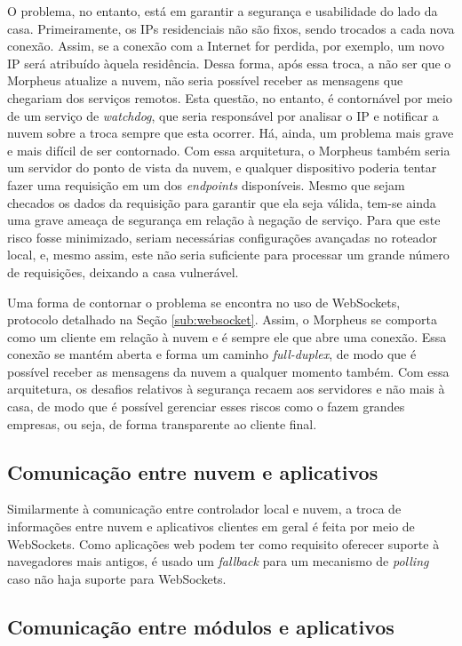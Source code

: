 O problema, no entanto, está em garantir a segurança e usabilidade do lado da casa. Primeiramente, os IPs residenciais não são fixos, sendo trocados a cada nova conexão. Assim, se a conexão com a Internet for perdida, por exemplo, um novo IP será atribuído àquela residência. Dessa forma, após essa troca, a não ser que o Morpheus atualize a nuvem, não seria possível receber as mensagens que chegariam dos serviços remotos. Esta questão, no entanto, é contornável por meio de um serviço de \emph{watchdog}, que seria responsável por analisar o IP e notificar a nuvem sobre a troca sempre que esta ocorrer. Há, ainda, um problema mais grave e mais difícil de ser contornado. Com essa arquitetura, o Morpheus também seria um servidor do ponto de vista da nuvem, e qualquer dispositivo poderia tentar fazer uma requisição em um dos \emph{endpoints} disponíveis. Mesmo que sejam checados os dados da requisição para garantir que ela seja válida, tem-se ainda uma grave ameaça de segurança em relação à negação de serviço. Para que este risco fosse minimizado, seriam necessárias configurações avançadas no roteador local, e, mesmo assim, este não seria suficiente para processar um grande número de requisições, deixando a casa vulnerável.

Uma forma de contornar o problema se encontra no uso de WebSockets, protocolo detalhado na Seção \ref{sub:websocket}. Assim, o Morpheus se comporta como um cliente em relação à nuvem e é sempre ele que abre uma conexão. Essa conexão se mantém aberta e forma um caminho \emph{full-duplex}, de modo que é possível receber as mensagens da nuvem a qualquer momento também. Com essa arquitetura, os desafios relativos à segurança recaem aos servidores e não mais à casa, de modo que é possível gerenciar esses riscos como o fazem grandes empresas, ou seja, de forma transparente ao cliente final.

\subsection{Comunicação entre nuvem e aplicativos}

Similarmente à comunicação entre controlador local e nuvem, a troca de informações entre nuvem e aplicativos clientes em geral é feita por meio de WebSockets. Como aplicações web podem ter como requisito oferecer suporte à navegadores mais antigos, é usado um \emph{fallback} para um mecanismo de \emph{polling} caso não haja suporte para WebSockets.

\subsection{Comunicação entre módulos e aplicativos}

